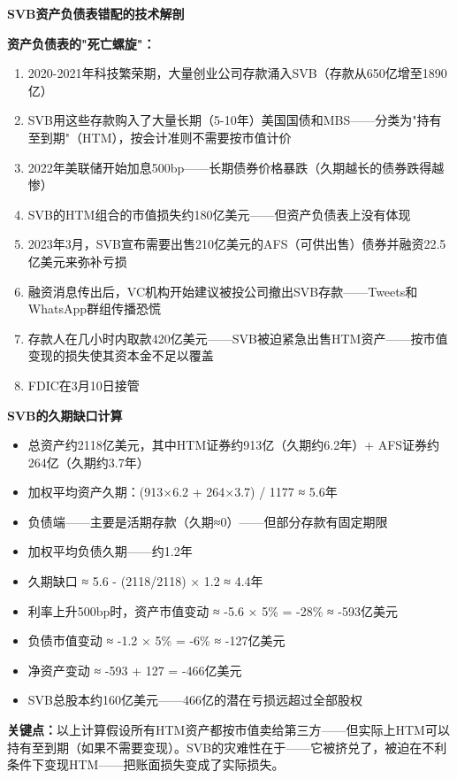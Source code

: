 \documentclass[a4paper,11pt]{ctexbook}
\begin{document}
\begin{qualitative}
\textbf{SVB资产负债表错配的技术解剖}

\textbf{资产负债表的"死亡螺旋"：}
\begin{enumerate}
  \item 2020-2021年科技繁荣期，大量创业公司存款涌入SVB（存款从650亿增至1890亿）
  \item SVB用这些存款购入了大量长期（5-10年）美国国债和MBS——分类为"持有至到期"（HTM），按会计准则不需要按市值计价
  \item 2022年美联储开始加息500bp——长期债券价格暴跌（久期越长的债券跌得越惨）
  \item SVB的HTM组合的市值损失约180亿美元——但资产负债表上没有体现
  \item 2023年3月，SVB宣布需要出售210亿美元的AFS（可供出售）债券并融资22.5亿美元来弥补亏损
  \item 融资消息传出后，VC机构开始建议被投公司撤出SVB存款——Tweets和WhatsApp群组传播恐慌
  \item 存款人在几小时内取款420亿美元——SVB被迫紧急出售HTM资产——按市值变现的损失使其资本金不足以覆盖
  \item FDIC在3月10日接管
\end{enumerate}
\end{qualitative}

\begin{quantitative}
\textbf{SVB的久期缺口计算}

\begin{itemize}
  \item 总资产约2118亿美元，其中HTM证券约913亿（久期约6.2年）+ AFS证券约264亿（久期约3.7年）
  \item 加权平均资产久期：(913×6.2 + 264×3.7) / 1177 ≈ 5.6年
  \item 负债端——主要是活期存款（久期≈0）——但部分存款有固定期限
  \item 加权平均负债久期——约1.2年
  \item 久期缺口 ≈ 5.6 - (2118/2118) × 1.2 ≈ 4.4年
  \item 利率上升500bp时，资产市值变动 ≈ -5.6 × 5\% = -28\% ≈ -593亿美元
  \item 负债市值变动 ≈ -1.2 × 5\% = -6\% ≈ -127亿美元
  \item 净资产变动 ≈ -593 + 127 = -466亿美元
  \item SVB总股本约160亿美元——466亿的潜在亏损远超过全部股权
\end{itemize}

\textbf{关键点：}以上计算假设所有HTM资产都按市值卖给第三方——但实际上HTM可以持有至到期（如果不需要变现）。SVB的灾难性在于——它被挤兑了，被迫在不利条件下变现HTM——把账面损失变成了实际损失。
\end{quantitative}
\end{document}
